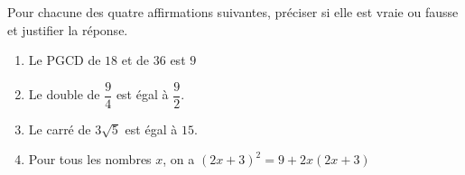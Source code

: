 
\medskip

Pour chacune des quatre affirmations suivantes, préciser si elle est vraie ou fausse 
et justifier la réponse.

\medskip
 
\begin{enumerate}
\item Le PGCD de $18$ et de $36$ est $9$ 
\item Le double de $\dfrac{9}{4}$ est égal à $\dfrac{9}{2}$. 
\item Le carré de $3\sqrt{5}$ est égal à $15$. 
\item Pour tous les nombres $x$, on a $(2x + 3)^2 = 9 + 2x(2x + 3)$ 
\end{enumerate}

\bigskip

